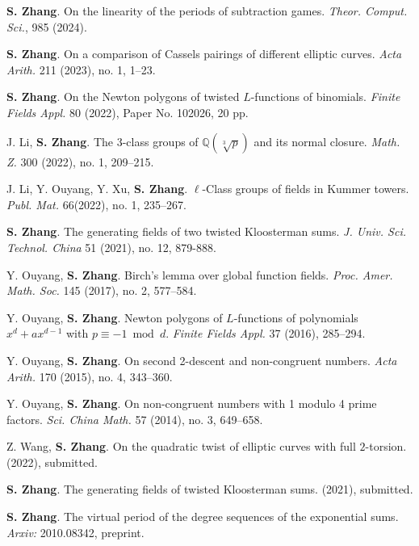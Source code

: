 \documentclass[11pt]{article}
\begin{document}
\newpage
{}
\begin{cvlist}
	\item \textbf{S. Zhang}.
	On the linearity of the periods of subtraction games.
	{\em Theor. Comput. Sci.}, 985 (2024).
	
	\item \textbf{S. Zhang}.
	On a comparison of Cassels pairings of different elliptic curves.
	{\em Acta Arith.} 211 (2023), no. 1, 1--23.
	
	\item \textbf{S. Zhang}.
	On the Newton polygons of twisted $L$-functions of binomials.
	{\em Finite Fields Appl.} 80 (2022), Paper No. 102026, 20 pp.

	\item J. Li, \textbf{S. Zhang}.
	The $3$-class groups of $\mathbb{Q}(\sqrt[3]{p})$ and its normal closure.
	{\em Math. Z.} 300 (2022), no. 1, 209--215.

	\item J. Li, Y. Ouyang, Y. Xu, \textbf{S. Zhang}.
	$\ell$-Class groups of fields in Kummer towers.
	{\em Publ. Mat.} 66(2022), no. 1, 235--267.

	\item \textbf{S. Zhang}.
	The generating fields of two twisted Kloosterman sums.
	{\em J. Univ. Sci. Technol. China} 51 (2021), no. 12, 879-888.

	\item Y. Ouyang, \textbf{S. Zhang}.
	Birch's lemma over global function fields.
	{\em Proc. Amer. Math. Soc.} 145 (2017), no. 2, 577--584.

	\item Y. Ouyang, \textbf{S. Zhang}.
	Newton polygons of $L$-functions of polynomials $x^d+ax^{d-1}$ with $p\equiv -1 \bmod d$.
	{\em Finite Fields Appl.} 37 (2016), 285--294.

	\item Y. Ouyang, \textbf{S. Zhang}.
	On second 2-descent and non-congruent numbers.
	{\em Acta Arith.} 170 (2015), no. 4, 343--360.

	\item Y. Ouyang, \textbf{S. Zhang}.
	On non-congruent numbers with 1 modulo 4 prime factors.
	{\em Sci. China Math.} 57 (2014), no. 3, 649--658.
\end{cvlist}


\begin{cvlist}
	\item Z. Wang, \textbf{S. Zhang}.
	On the quadratic twist of elliptic curves with full $2$-torsion.
	(2022), submitted.

	\item \textbf{S. Zhang}.
	The generating fields of twisted Kloosterman sums.
	(2021), submitted.

	\item \textbf{S. Zhang}.
	The virtual period of the degree sequences of the exponential sums.
	{\em Arxiv:} 2010.08342, preprint.
\end{cvlist}
\end{document}
